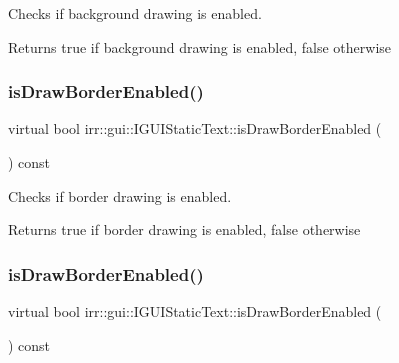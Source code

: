 Checks if background drawing is enabled. 

\begin{DoxyReturn}{Returns}
true if background drawing is enabled, false otherwise 
\end{DoxyReturn}
\mbox{\label{classirr_1_1gui_1_1IGUIStaticText_a52478a36f77cfbc62e1f57a486e0a083}} 
\subsubsection{\texorpdfstring{is\+Draw\+Border\+Enabled()}{isDrawBorderEnabled()}\hspace{0.1cm}{\footnotesize\ttfamily [1/2]}}
{\footnotesize\ttfamily virtual bool irr\+::gui\+::\+I\+G\+U\+I\+Static\+Text\+::is\+Draw\+Border\+Enabled (\begin{DoxyParamCaption}{ }\end{DoxyParamCaption}) const\hspace{0.3cm}{\ttfamily [pure virtual]}}



Checks if border drawing is enabled. 

\begin{DoxyReturn}{Returns}
true if border drawing is enabled, false otherwise 
\end{DoxyReturn}
\mbox{\label{classirr_1_1gui_1_1IGUIStaticText_a52478a36f77cfbc62e1f57a486e0a083}} 
\subsubsection{\texorpdfstring{is\+Draw\+Border\+Enabled()}{isDrawBorderEnabled()}\hspace{0.1cm}{\footnotesize\ttfamily [2/2]}}
{\footnotesize\ttfamily virtual bool irr\+::gui\+::\+I\+G\+U\+I\+Static\+Text\+::is\+Draw\+Border\+Enabled (\begin{DoxyParamCaption}{ }\end{DoxyParamCaption}) const\hspace{0.3cm}{\ttfamily [pure virtual]}}



